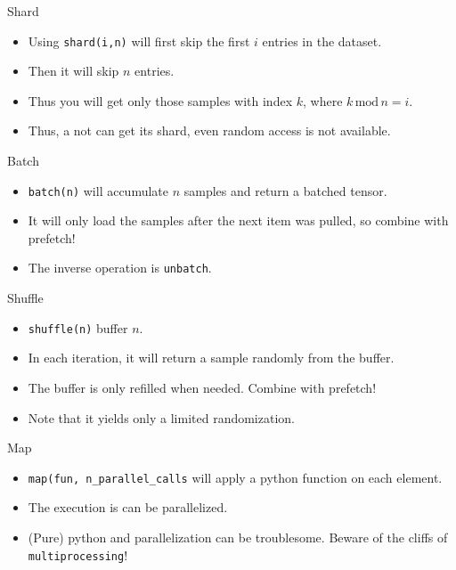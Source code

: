 \documentclass[t, 10pt, aspectratio=1610]{beamer}
\begin{document}
\begin{frame}{Shard}
    \picdatasetshard
    \begin{itemize}
        \item Using \texttt{shard(i,n)} will first skip the first $i$ entries in the dataset.
        \item Then it will skip $n$ entries.
        \item Thus you will get only those samples with index $k$,
        where $k\, \text{mod}\, n = i$.
        \item Thus, a not can get its shard, even random access is not available.
    \end{itemize}
\end{frame}

\begin{frame}{Batch}
    \picdatasetbatch
    \begin{itemize}
        \item \texttt{batch(n)} will accumulate $n$ samples and return a batched tensor.
        \item It will only load the samples after the next item was pulled, so combine with prefetch!
        \item The inverse operation is \texttt{unbatch}.
    \end{itemize}
\end{frame}

\begin{frame}{Shuffle}
    \picdatasetshuffle
    \begin{itemize}
        \item \texttt{shuffle(n)} buffer $n$.
        \item In each iteration, it will return a sample randomly from the buffer.
        \item The buffer is only refilled when needed. Combine with prefetch!
        \item Note that it yields only a limited randomization.
    \end{itemize}
\end{frame}

\begin{frame}{Map}
    \timetransformparallel
    \begin{itemize}
        \item \texttt{map(fun, n\_parallel\_calls} will apply a python function on each element.
        \item The execution is can be parallelized.
        \item (Pure) python and parallelization can be troublesome. Beware of the cliffs of \texttt{multiprocessing}!
    \end{itemize}
\end{frame}
\end{document}
